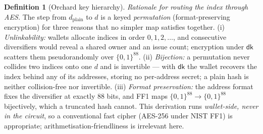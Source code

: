\documentclass[11pt,a4paper]{article}
\theoremstyle{definition}
\newtheorem{definition}[theorem]{Definition}
\newcommand{\dk}{\ensuremath{\mathsf{dk}}}
\begin{document}
\begin{definition}[Orchard key hierarchy]
\emph{Rationale for routing the index through AES.} The step from
$d_{\mathrm{plain}}$ to $d$ is a keyed \emph{permutation} (format-preserving
encryption) for three reasons that no simpler map satisfies together.
(i) \emph{Unlinkability:} wallets allocate indices in order $0, 1, 2, \dots$,
and consecutive diversifiers would reveal a shared owner and an issue count;
encryption under $\dk$ scatters them pseudorandomly over $\{0,1\}^{88}$.
(ii) \emph{Bijection:} a permutation never collides two indices onto one $d$
and is invertible --- with $\dk$ the wallet recovers the index behind any of
its addresses, storing no per-address secret; a plain hash is neither
collision-free nor invertible. (iii) \emph{Format preservation:} the address
format fixes the diversifier at exactly $88$ bits, and FF1 maps
$\{0,1\}^{88} \to \{0,1\}^{88}$ bijectively, which a truncated hash cannot.
This derivation runs \emph{wallet-side, never in the circuit}, so a
conventional fast cipher (AES-256 under NIST FF1) is appropriate;
arithmetisation-friendliness is irrelevant here.
\end{definition}
\end{document}
